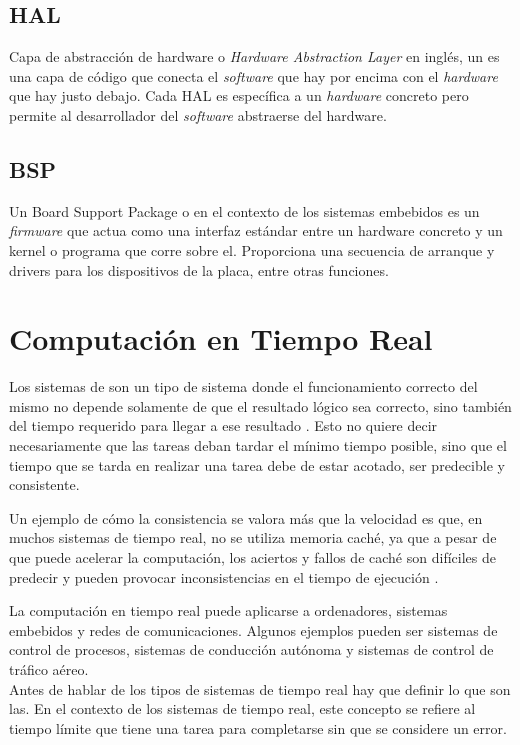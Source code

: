 \subsection{HAL}
Capa de abstracción de hardware o \emph{Hardware Abstraction Layer} en inglés, un  es una capa de código que conecta el \emph{software} que hay por encima con el \emph{hardware} que hay justo debajo. Cada HAL es específica a un \emph{hardware} concreto pero permite al desarrollador del \emph{software} abstraerse del hardware. \cite{Yoo2003}

\subsection{BSP}
Un Board Support Package o  en el contexto de los sistemas embebidos es un \emph{firmware} que actua como una interfaz estándar entre un hardware concreto y un kernel o programa que corre sobre el. Proporciona una secuencia de arranque y drivers para los dispositivos de la placa, entre otras funciones.\cite{fredericksfaq}\\

\section{Computación en Tiempo Real}
Los sistemas de  son un tipo de sistema donde el funcionamiento correcto del mismo no depende solamente de que el resultado lógico sea correcto, sino también del tiempo requerido para llegar a ese resultado \cite{stankovic}. Esto no quiere decir necesariamente que las tareas deban tardar el mínimo tiempo posible, sino que el tiempo que se tarda en realizar una tarea debe de estar acotado, ser predecible y consistente.

Un ejemplo de cómo la consistencia se valora más que la velocidad es que, en muchos sistemas de tiempo real, no se utiliza memoria caché, ya que a pesar de que puede acelerar la computación, los aciertos y fallos de caché son difíciles de predecir y pueden provocar inconsistencias en el tiempo de ejecución \cite{MILLIGAN1996}.

La computación en tiempo real puede aplicarse a ordenadores, sistemas embebidos y redes de comunicaciones. Algunos ejemplos pueden ser sistemas de control de procesos, sistemas de conducción autónoma y sistemas de control de tráfico aéreo.\\

Antes de hablar de los tipos de sistemas de tiempo real hay que definir lo que son las. En el contexto de los sistemas de tiempo real, este concepto se refiere al tiempo límite que tiene una tarea para completarse sin que se considere un error.

